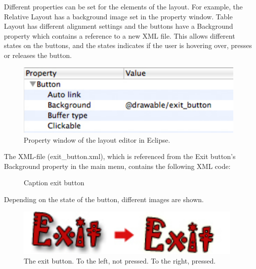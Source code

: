 Different properties can be set for the elements of the layout. For example, the Relative Layout has a background image set in the property window. Table Layout has different alignment settings and the buttons have a Background property which contains a reference to a new XML file. This allows different states on the buttons, and the states indicates if the user is hovering over, presses or releases the button.

\begin{figure}[here]
\begin{center}
\includegraphics[scale=1]{pics/chapters/chapter4/exitbuttonref}
\end{center}
\caption{Property window of the layout editor in Eclipse.}
\label{fig:propWindowLayoutEditorEclipse}
\end{figure}

The XML-file (exit\_button.xml), which is referenced from the Exit button's Background property in the main menu, contains the following XML code:

\begin{figure}[htb]

\begin{small}

\end{small}

\caption{Caption exit button}
\label{fig:codeExXMLExitButton}
\end{figure}

\clearpage

Depending on the state of the button, different images are shown.

\begin{figure}[here]

\begin{center}
\includegraphics[scale=1]{pics/chapters/chapter4/exitbutton}
\end{center}

\caption{The exit button. To the left, not pressed. To the right, pressed.}
\label{fig:exitButtonPressed}
\end{figure}


